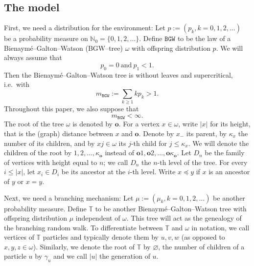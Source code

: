 \documentclass[11 pt]{article}
\theoremstyle{definition}
\numberwithin{equation}{section}
\newcommand{\TT}{\mathbb{T}} %
\newcommand{\rt}{\mathbf{o}} %
\begin{document}
\subsection{The model}\label{The model}
First, we need a distribution for the environment: Let $p:=(p_k, k= 0,1,2,\ldots)$ be a probability measure on $\mathbb{N}_0 = \{0,1,2,\ldots\}$. 
Define $\mathtt{BGW}$ to be the law of a Bienaymé--Galton--Watson (BGW--tree) $\omega$ with offspring distribution $p$. 
We will always assume that
\begin{equation}\label{eq:no_leaves_bgw}
p_0=0 ~\text{and}~ p_1<1.
\end{equation}
Then the Bienaymé--Galton--Watson tree is without leaves and supercritical, i.e.\ with 
\[
m_{\mathtt{BGW}}:= \sum_{k\ge 1} k p_k >1.  
\]
Throughout this paper, we also suppose that
\[
m_{\mathtt{BGW}}<\infty. 
\]
The root of the tree $\omega$ is denoted by $\rt$. 
For  a vertex $x \in \omega$, write $|x|$ for its height, that is the (graph) distance between $x$ and $\rt$. Denote by $x_-$ its parent, by $\kappa_x$ the number of its children, and by $xj\in \omega$ its $j$-th child for $j\le \kappa_x$. 
We will denote the children of the root by $1,2, \ldots, \kappa_\rt$ instead of $\rt 1,\rt 2, \ldots, \rt\kappa_\rt$. Let $D_n$ be the family of vertices with height equal to $n$; we call $D_n$ the $n$-th level of the tree.  
For every $i\le |x|$, let $x_i \in D_i$ be its ancestor at the $i$-th level. 
 Write $x\preceq y$ if $x$ is an ancestor of $y$ or $x=y$. 

Next, we need a branching mechanism: Let $\mu:=(\mu_k, k= 0,1,2,\ldots)$ be another probability measure. Define $\TT$ to be another Bienaymé--Galton--Watson tree with offspring distribution $\mu$ independent of $\omega$. This tree will act as the genealogy of the branching random walk. To differentiate between $\TT$ and $\omega$ in notation, we call vertices of $\TT$ particles and typically denote them by $u,v,w$ (as opposed to $x,y,z\in \omega$). Similarly, we denote the root of $\TT$ by $\varnothing$, the number of children of a particle $u$ by $\gamma_u$ and we call $\vert u \vert$ the generation of $u$.
\end{document}
